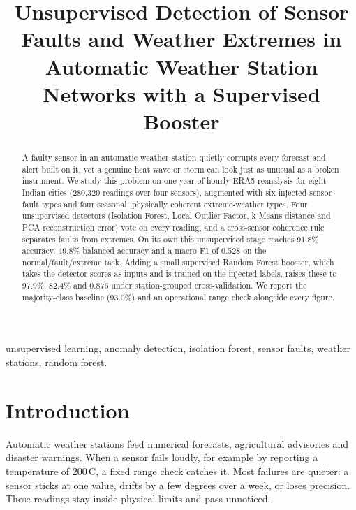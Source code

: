 \documentclass[conference]{IEEEtran}
\begin{document}
\title{Unsupervised Detection of Sensor Faults and Weather Extremes in Automatic Weather Station Networks with a Supervised Booster}

\author{
}

\maketitle

\begin{abstract}
A faulty sensor in an automatic weather station quietly corrupts every forecast and alert built on
it, yet a genuine heat wave or storm can look just as unusual as a broken instrument. We study this
problem on one year of hourly ERA5 reanalysis for eight Indian cities (280{,}320 readings over four
sensors), augmented with six injected sensor-fault types and four seasonal, physically coherent
extreme-weather types. Four unsupervised detectors (Isolation Forest, Local Outlier Factor, k-Means
distance and PCA reconstruction error) vote on every reading, and a cross-sensor coherence rule
separates faults from extremes. On its own this unsupervised stage reaches 91.8\% accuracy, 49.8\%
balanced accuracy and a macro F1 of 0.528 on the normal/fault/extreme task. Adding a small
supervised Random Forest booster, which takes the detector scores as inputs and is trained on the
injected labels, raises these to 97.9\%, 82.4\% and 0.876 under station-grouped cross-validation. We
report the majority-class baseline (93.0\%) and an operational range check alongside every figure.
\end{abstract}

\begin{IEEEkeywords}
unsupervised learning, anomaly detection, isolation forest, sensor faults, weather stations,
random forest.
\end{IEEEkeywords}

\section{Introduction}
Automatic weather stations feed numerical forecasts, agricultural advisories and disaster warnings.
When a sensor fails loudly, for example by reporting a temperature of 200\,\textdegree C, a fixed
range check catches it. Most failures are quieter: a sensor sticks at one value, drifts by a few
degrees over a week, or loses precision. These readings stay inside physical limits and pass
unnoticed.
\end{document}
